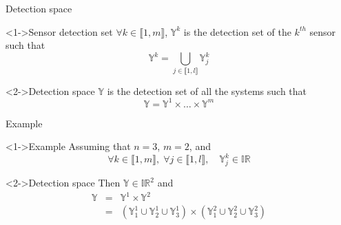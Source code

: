\documentclass{beamer}
\begin{document}
            \begin{frame}{Detection space}
                \begin{block}<1->{Sensor detection set}
                    $\forall k \in \llbracket 1, m\rrbracket$, $\mathbb{Y}^k$ is the detection set of the $k^{th}$ sensor such that
                    \begin{equation}
                        \mathbb{Y}^k = \bigcup_{j \in \llbracket 1, l\rrbracket} \mathbb{Y}_j^k
                    \end{equation}
                \end{block}
                \begin{block}<2->{Detection space}
                    $\mathbb{Y}$ is the detection set of all the systems such that
                    \begin{equation}
                        \mathbb{Y} = \mathbb{Y}^1 \times \dots \times \mathbb{Y}^m
                    \end{equation}
                \end{block}
            \end{frame}

            \begin{frame}{Example}
                \begin{exampleblock}<1->{Example}
                    Assuming that $n = 3$, $m = 2$, and
                    $$\forall k \in \llbracket 1, m\rrbracket, \;  \forall j \in \llbracket 1, l\rrbracket, \quad \mathbb{Y}_j^k \in \mathbb{IR}$$
                \end{exampleblock}
                \begin{exampleblock}<2->{Detection space}
                    Then $\mathbb{Y} \in \mathbb{IR}^2$ and
                    \begin{eqnarray}
                        \mathbb{Y} & = & \mathbb{Y}^1 \times \mathbb{Y}^2 \\
                        & = & \left(\mathbb{Y}_1^1 \cup \mathbb{Y}_2^1 \cup \mathbb{Y}_3^1\right) \times \left(\mathbb{Y}_1^2 \cup \mathbb{Y}_2^2 \cup \mathbb{Y}_3^2\right)
                    \end{eqnarray}
                \end{exampleblock}
            \end{frame}
\end{document}
